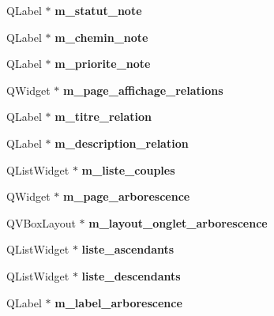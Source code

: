 \begin{DoxyCompactItemize}
\item 
\mbox{\label{class_fen_principale_ad87eb49d7a0600761d3410453fa7e635}} 
Q\+Label $\ast$ {\bfseries m\+\_\+statut\+\_\+note}
\item 
\mbox{\label{class_fen_principale_af4e03cb1d4caa261afe68784ad2ff9b5}} 
Q\+Label $\ast$ {\bfseries m\+\_\+chemin\+\_\+note}
\item 
\mbox{\label{class_fen_principale_a03759c7aef2276994e69457a2a4d4ef6}} 
Q\+Label $\ast$ {\bfseries m\+\_\+priorite\+\_\+note}
\item 
\mbox{\label{class_fen_principale_a57b8495c7b3b0aa329648ffb59c723cd}} 
Q\+Widget $\ast$ {\bfseries m\+\_\+page\+\_\+affichage\+\_\+relations}
\item 
\mbox{\label{class_fen_principale_a1d9603d0f548e700e1ea3ce21f8edb8e}} 
Q\+Label $\ast$ {\bfseries m\+\_\+titre\+\_\+relation}
\item 
\mbox{\label{class_fen_principale_a0a6d9abb0fcea90f1b7d588e086680e5}} 
Q\+Label $\ast$ {\bfseries m\+\_\+description\+\_\+relation}
\item 
\mbox{\label{class_fen_principale_afbf019cdafdbf9eb694b944010e8487e}} 
Q\+List\+Widget $\ast$ {\bfseries m\+\_\+liste\+\_\+couples}
\item 
\mbox{\label{class_fen_principale_a889991f53d2db1d8f2871d3d1a7a689a}} 
Q\+Widget $\ast$ {\bfseries m\+\_\+page\+\_\+arborescence}
\item 
\mbox{\label{class_fen_principale_ad9f09d1e423a7d069538c37193f68efc}} 
Q\+V\+Box\+Layout $\ast$ {\bfseries m\+\_\+layout\+\_\+onglet\+\_\+arborescence}
\item 
\mbox{\label{class_fen_principale_ab5623b2e095c62d25c37461304cc8de0}} 
Q\+List\+Widget $\ast$ {\bfseries liste\+\_\+ascendants}
\item 
\mbox{\label{class_fen_principale_ab1f23c14a220bb4d40b9becfe76435b4}} 
Q\+List\+Widget $\ast$ {\bfseries liste\+\_\+descendants}
\item 
\mbox{\label{class_fen_principale_a012fbbe56e9e66c7985dc480ba2fa41a}} 
Q\+Label $\ast$ {\bfseries m\+\_\+label\+\_\+arborescence}
\end{DoxyCompactItemize}


